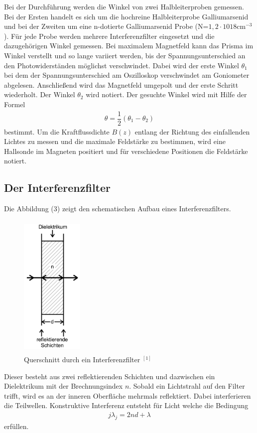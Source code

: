\documentclass{article}
\begin{document}
Bei der Durchführung werden die Winkel von zwei Halbleiterproben gemessen. Bei der Ersten handelt es sich um die hochreine Halbleiterprobe Galliumarsenid und bei der Zweiten um eine n-dotierte Galliumarsenid Probe (N=$1,2\cdot10{18}\text{cm}^{-3}$). Für jede Probe werden mehrere Interferenzfilter eingesetzt und die dazugehörigen Winkel gemessen.  Bei maximalem Magnetfeld kann das Prisma im Winkel verstellt und so lange variiert werden, bis der Spannungsunterschied an den Photowiderständen möglichst verschwindet. Dabei wird der erste Winkel $\theta_1$ bei dem der Spannungsunterschied am Oszilloskop verschwindet am Goniometer abgelesen. Anschließend wird das Magnetfeld umgepolt und der erste Schritt wiederholt. Der Winkel $\theta_2$ wird notiert. Der gesuchte Winkel wird mit Hilfe der Formel 
\begin{align}
\theta=\dfrac{1}{2}(\theta_1-\theta_2)
\end{align}
bestimmt. Um die Kraftflussdichte $B(z)$ entlang der Richtung des einfallenden Lichtes zu messen und die maximale Feldstärke zu bestimmen, wird eine Hallsonde im Magneten positiert und für verschiedene Positionen die Feldstärke notiert. 
\subsection{Der Interferenzfilter}
Die Abbildung (3) zeigt den schematischen Aufbau eines Interferenzfilters.
\begin{figure}[H]
	\centering
	\includegraphics[height=7cm, width=3cm]{interferenz.png}
	\caption{Querschnitt durch ein Interferenzfilter $^{[1]}$}   
	\label{fig: abb. 1}
\end{figure}

 Dieser besteht aus zwei reflektierenden Schichten und dazwischen ein Dielektrikum mit der Brechnungsindex $n$. Sobald ein Lichtstrahl auf den Filter trifft, wird es an der inneren Oberfläche mehrmals reflektiert. Dabei interferieren die Teilwellen. Konstruktive Interferenz entsteht für Licht welche die Bedingung 
\begin{align}
j\lambda_j=2nd+\lambda
\end{align}
erfüllen. 
\end{document}
